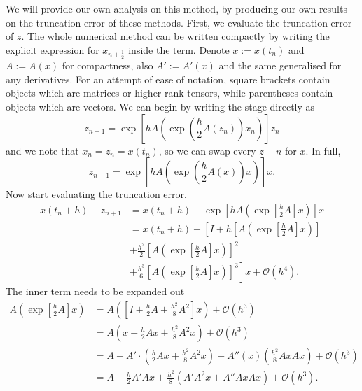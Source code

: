 We will provide our own analysis on this method, by producing our own results on the truncation error of these methods.
First, we evaluate the truncation error of $z$. The whole numerical method can be written compactly by writing the explicit expression for $x_{n+\frac{1}{2}}$ inside the term.
Denote $x := x(t_n)$ and $A := A(x)$ for compactness, also $A' := A'(x)$ and the same generalised for any derivatives.
For an attempt of ease of notation, square brackets contain objects which are matrices or higher rank tensors, while parentheses contain objects which are vectors.
We can begin by writing the stage directly as
\begin{equation*}
    z_{n+1} = \exp \left[ h A \left( \exp \left( \frac{h}{2} A(z_n) \right) x_n \right) \right] z_n
\end{equation*}
and we note that $x_n = z_n = x(t_n)$, so we can swap every $z+n$ for $x$.
In full,
\begin{equation}
    z_{n+1} = \exp \left[ h A \left( \exp \left( \frac{h}{2} A(x) \right) x \right) \right] x.
    \label{eqn:strangz}
\end{equation}
Now start evaluating the truncation error.
\begin{align*}
    x(t_n + h) - z_{n+1} &= x(t_n+h) - \exp \left[ h A \left( \exp \left[ \frac{h}{2}A \right]x \right) \right]x \\
    &= x(t_n + h) - \left[
        I + h \left[ A \left( \exp \left[ \frac{h}{2}A \right]x \right) \right] \right. \\
        &+ \frac{h^2}{2} \left[ A \left( \exp \left[ \frac{h}{2}A \right]x \right) \right]^2 \\
        &+ \frac{h^3}{6} \left. \left[ A \left( \exp \left[ \frac{h}{2}A \right]x \right) \right]^3
    \right]x + \mathcal{O}(h^4).
\end{align*}
The inner term needs to be expanded out
\begin{align*}
    A\left( \exp \left[ \frac{h}{2}A \right]x \right) &= A \left( \left[ I + \frac{h}{2}A + \frac{h^2}{8}A^2 \right]x \right) + \mathcal{O}(h^3) \\
    &= A\left( x + \frac{h}{2}Ax + \frac{h^2}{8}A^2 x \right) + \mathcal{O}(h^3) \\
    &= A + A' \cdot \left( \frac{h}{2} Ax + \frac{h^2}{8} A^2 x \right) + A''(x) \left( \frac{h^2}{8}AxAx \right) + \mathcal{O}(h^3) \\
    &= A + \frac{h}{2}A'Ax + \frac{h^2}{8} \left( A' A^2 x + A'' Ax Ax \right) + \mathcal{O}(h^3).
\end{align*}
